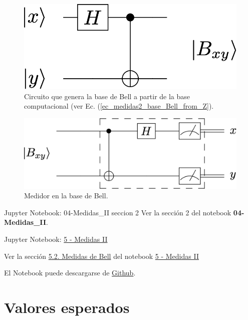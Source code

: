 \documentclass[a4paper,11pt]{book} %
\numberwithin{equation}{chapter}
\begin{document}
	\begin{figure}[H]
	\centering 
	\includegraphics[width=0.25\linewidth]{Figuras/Fig_medidas2_circuit_Bell_basis.png}
	\caption{Circuito que genera la base de Bell a partir de la base computacional (ver Ec. (\ref{ec_medidas2_base_Bell_from_Z}).}
	\label{Fig_medidas2_circuit_Bell_basis}
	\end{figure}

	\begin{figure}[H]
	\centering 
	\includegraphics[width=0.4\linewidth]{Figuras/Fig_medidas2_Bell_meter.png}
	\caption{Medidor en la base de Bell. }
	\label{Fig_medidas2_Bell_meter}
	\end{figure}

	\begin{mybox_orange}{Jupyter Notebook: 04-Medidas\_II seccion 2}
	Ver la sección 2 del notebook \textbf{04-Medidas\_II}.
	\end{mybox_orange}


	\begin{mybox_orange}{Jupyter Notebook: \href{https://www.scbi.uma.es/web/wp-content/uploads/Jupyterbook/CICC_UMA/Notebooks/html/docs/Part_01/Chapter_05-Medidas_II_myst.html}{5 - Medidas II}}

	Ver la sección \href{https://www.scbi.uma.es/web/wp-content/uploads/Jupyterbook/CICC_UMA/Notebooks/html/docs/Part_01/Chapter_05-Medidas_II_myst.html#medidas-bell}{5.2. Medidas de Bell} del notebook \href{https://www.scbi.uma.es/web/wp-content/uploads/Jupyterbook/CICC_UMA/Notebooks/html/docs/Part_01/Chapter_05-Medidas_II_myst.html}{5 - Medidas II}
	
	El Notebook puede descargarse de \href{https://github.com/davidcb98/CICC_UMA/blob/master/Notebooks/Part_01/Chapter_05-Medidas_II.ipynb}{Github}.
	\end{mybox_orange}



    \section{Valores esperados}
\end{document}
